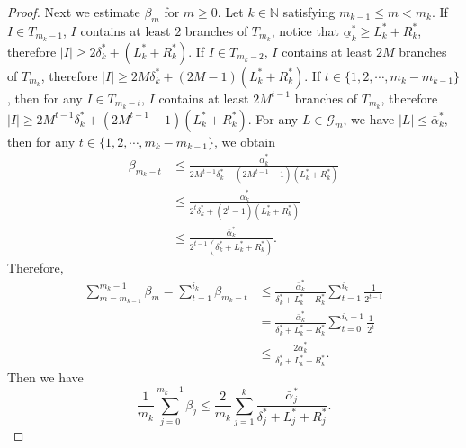 \documentclass[reqno]{amsart}
\theoremstyle{plain}
\theoremstyle{definition}
\theoremstyle{remark}
\numberwithin{equation}{section} \DeclareMathOperator\intr{int}
\begin{document}
\begin{proof}
Next we estimate  $\beta_m$ for $m\ge0$. Let $k\in \mathbb{N} $ satisfying $m_{k-1}\le m < m_k$.
If $I\in T_{m_{k}-1}$, $I$ contains at least $2$ branches of $T_{m_k}$, notice that $\underline{\alpha}^*_k\ge L^*_k+R^*_k $,  therefore $\left | I \right | \ge 2\delta^*_k+(L^*_k+R^*_k)$.
If $I\in T_{m_{k}-2}$, $I$ contains at least $2M$ branches of $T_{m_k}$, therefore $\left | I \right | \ge 2M\delta^*_k+(2M-1)(L^*_k+R^*_k)$.
If $t\in \{1,2, \cdots, m_k-m_{k-1}\}$, then for any $I \in T_{m_k-t}$, $I$ contains at least $2M^{t-1}$ branches of $T_{m_k}$, therefore $\left | I \right | \ge 2M^{t-1}\delta^*_k+(2M^{t-1}-1)(L^*_k+R^*_k)$.
For any $L\in \mathcal{G}_m$, we have $\left | L \right | \le \bar{\alpha}^*_k,$
then for any $t\in \{1,2, \cdots, m_k-m_{k-1}\}$, we obtain
\begin{equation}
\begin{aligned}
\beta_{m_k-t}&\le \frac{\bar{\alpha}^*_k}{2M^{t-1}\delta^*_k+(2M^{t-1}-1)(L^*_k+R^*_k)}\\
&\le \frac{\bar{\alpha}^*_k}{2^{t}\delta^*_k+(2^{t}-1)(L^*_k+R^*_k)}\\
&\le \frac{\bar{\alpha}^*_k}{2^{t-1}(\delta^*_k+L^*_k+R^*_k)}.
\end{aligned}
\end{equation}
Therefore,
\begin{equation}\label{xxxx}
\begin{aligned}
\sum_{m = m_{k-1}}^{m_k-1} \beta_{m} = \sum_{t  = 1}^{i_k} \beta_{m_k-t}&\le\frac{\bar{\alpha}^*_k}{\delta^*_k+L^*_k+R^*_k}\sum_{t = 1}^{i_k}\frac{1}{2^{t-1}} \\
 &=\frac{\bar{\alpha}^*_k}{\delta^*_k+L^*_k+R^*_k}\sum_{t =0}^{i_k-1}\frac{1}{2^{t}}\\
&\le \frac{2\bar{\alpha}^*_k}{\delta^*_k+L^*_k+R^*_k}.
\end{aligned}
\end{equation}
Then we have
\begin{equation}\label{xs}
\frac{1}{m_k} \sum_{j=0}^{m_k-1} \beta_{j} \le \frac{2}{m_k}\sum_{j=1}^{k} \frac{\bar{\alpha}^*_j}{\delta^*_j+L^*_j+R^*_j}.
\end{equation}


\end{proof}
\end{document}
